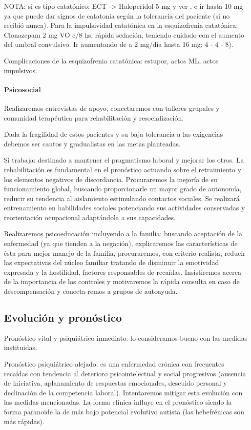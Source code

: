 NOTA: si es tipo catatónico: ECT -> Haloperidol 5 mg y ver , e ir hasta 10 mg ya que puede dar signos de catatonia según la tolerancia del paciente (si no recibió nunca). Para la impulsividad catatónica en la esquizofrenia catatónica: Clonazepam 2 mg VO c/8 hs, rápida sedación, teniendo cuidado con el aumento del umbral convulsivo. Ir aumentando de a 2 mg/día hasta 16 mg: 4 - 4 - 8).

Complicaciones de la esquizofrenia catatónica: estupor, actos ML, actos impulsivos.
\paragraph*{Psicosocial}
Realizaremos entrevistas de apoyo, conectaremos con talleres grupales y comunidad terapéutica para rehabilitación y resocialización.

Dada la fragilidad de estos pacientes y su baja tolerancia a las exigencias debemos ser cautos y gradualistas en las metas planteadas.

Si trabaja: destinado a mantener el pragmatismo laboral y mejorar los otros. La rehabilitación es fundamental en el pronóstico actuando sobre el retraimiento y los elementos negativos de discordancia. Procuraremos la mejoría de su funcionamiento global, buscando proporcionarle un mayor grado de autonomía, reducir su tendencia al aislamiento estimulando contactos sociales. Se realizará entrenamiento en habilidades sociales potenciando sus actividades conservadas y reorientación ocupacional adaptándola a sus capacidades.

Realizaremos psicoeducación incluyendo a la familia: buscando aceptación de la enfermedad (ya que tienden a la negación), explicaremos las características de ésta para mejor manejo de la familia, procuraremos, con criterio realista, reducir las expectativas del núcleo familiar tratando de disminuir la emotividad expresada y la hostilidad, factores responsables de recaídas. Insistiremos acerca de la importancia de los controles y motivaremos la rápida consulta en caso de descompensación y conecta-remos a grupos de autoayuda.

\subsection*{Evolución y pronóstico}
Pronóstico vital y psiquiátrico inmediato: lo consideramos bueno con las medidas instituidas.

Pronóstico psiquiátrico alejado: es una enfermedad crónica con frecuentes recaídas con tendencia al deterioro psicointelectual y social progresivos (ausencia de iniciativa, aplanamiento de respuestas emocionales, descuido personal y declinación de la competencia laboral). Intentaremos mitigar esta evolución con las medidas mencionadas. La forma clínica influye en el pronóstico siendo la forma paranoide la de más bajo potencial evolutivo autista (las hebefrénicas son más rápidas).

